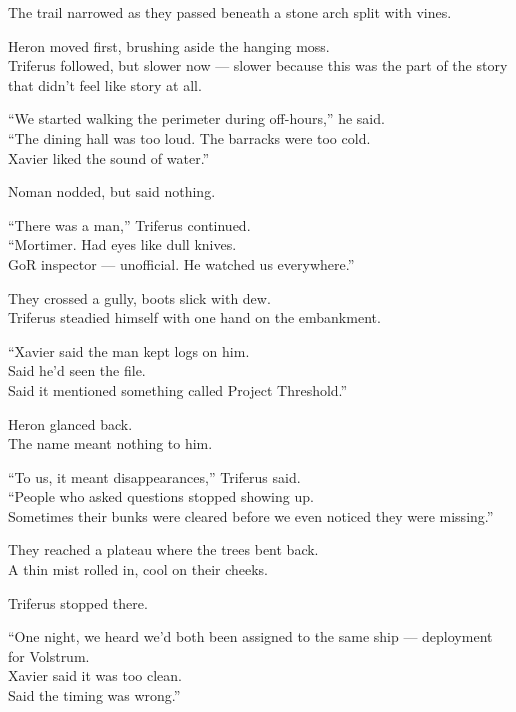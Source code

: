 \documentclass[12pt]{article}
\begin{document}
The trail narrowed as they passed beneath a stone arch split with vines.

Heron moved first, brushing aside the hanging moss.\\
Triferus followed, but slower now — slower because this was the part of the story that didn’t feel like story at all.

\vspace{1em}

“We started walking the perimeter during off-hours,” he said.\\
“The dining hall was too loud. The barracks were too cold.\\
Xavier liked the sound of water.”

Noman nodded, but said nothing.

\vspace{1em}

“There was a man,” Triferus continued.\\
“Mortimer. Had eyes like dull knives.\\
GoR inspector — unofficial. He watched us everywhere.”

They crossed a gully, boots slick with dew.\\
Triferus steadied himself with one hand on the embankment.

“Xavier said the man kept logs on him.\\
Said he’d seen the file.\\
Said it mentioned something called Project Threshold.”

Heron glanced back.\\
The name meant nothing to him.

“To us, it meant disappearances,” Triferus said.\\
“People who asked questions stopped showing up.\\
Sometimes their bunks were cleared before we even noticed they were missing.”

\vspace{1em}

They reached a plateau where the trees bent back.\\
A thin mist rolled in, cool on their cheeks.

Triferus stopped there.

“One night, we heard we’d both been assigned to the same ship — deployment for Volstrum.\\
Xavier said it was too clean.\\
Said the timing was wrong.”
\end{document}
